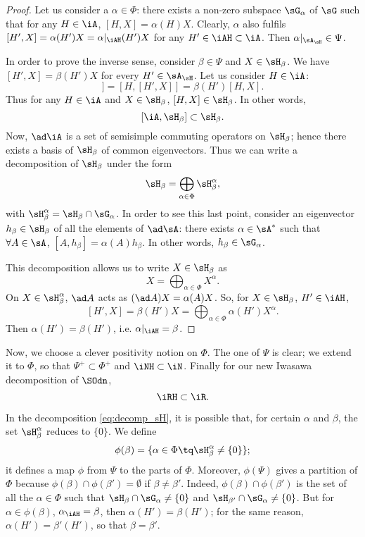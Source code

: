 \begin{proof}
	Let us consider a $\alpha\in\Phi$: there exists a non-zero subspace $\sG_{\alpha}$ of $\sG$ such that for any $H\in\iA$, $[H,X]=\alpha(H)X$. Clearly, $\alpha$ also fulfils $[H',X]=\alpha(H')X=\alpha|_{\iAH}(H')X$ for any $H'\in\iAH\subset\iA$. Then $\alpha|_{\sA_{\sH}}\in\Psi$.

	In order to prove the inverse sense, consider $\beta\in\Psi$ and $X\in\sH_{\beta}$. We have $[H',X]=\beta(H')X$ for every $H'\in\sA_{\sH}$. Let us consider $H\in\iA$:
	\begin{equation}
		[H',[H,X]]=[H,[H',X]]
		=\beta(H')[H,X].
	\end{equation}
	Thus for any $H\in\iA$ and $X\in\sH_{\beta}$, $[H,X]\in\sH_{\beta}$. In other words,
	\[
		[\iA,\sH_{\beta}]\subset\sH_{\beta}.
	\]
	Now, $\ad\iA$ is a set of semisimple commuting operators on $\sH_{\beta}$; hence there exists a basis of $\sH_{\beta}$ of common eigenvectors. Thus we can write a decomposition of $\sH_{\beta}$ under the form
	\begin{equation}\label{eq:decomp_sH}
		\sH_{\beta}=\bigoplus_{\alpha\in\Phi}\sH_{\beta}^{\alpha},
	\end{equation}
	with $\sH_{\beta}^{\alpha}=\sH_{\beta}\cap\sG_{\alpha}$. In order to see this last point, consider an eigenvector $h_{\beta}\in\sH_{\beta}$ of all the elements of $\ad\sA$: there exists $\alpha\in\sA^*$ such that $\forall A\in\sA$, $[A,h_{\beta}]=\alpha(A)h_{\beta}$. In other words, $h_{\beta}\in\sG_{\alpha}$.

	This decomposition allows us to write $X\in\sH_{\beta}$ as
	\[
		X=\bigoplus_{\alpha\in\Phi}X^{\alpha}.
	\]
	On $X\in\sH_{\beta}^{\alpha}$, $\ad A$ acts as $(\ad A)X=\alpha(A)X$.  So, for $X\in\sH_{\beta}$, $H'\in\iAH$,
	\[
		[H',X]=\beta(H')X=\bigoplus_{\alpha\in\Phi}\alpha(H')X^{\alpha}.
	\]
	Then $\alpha(H')=\beta(H')$, i.e. $\alpha|_{\iAH}=\beta$.

\end{proof}

Now, we choose a clever positivity notion on $\Phi$. The one of $\Psi$ is clear; we extend it to $\Phi$, so that $\Psi^+\subset\Phi^+$ and $\iNH\subset\iN$. Finally for our new Iwasawa decomposition of $\SOdn$,
\[
	\iRH\subset\iR.
\]

In the decomposition \eqref{eq:decomp_sH}, it is possible that, for certain $\alpha$ and $\beta$, the set $\sH_{\beta}^{\alpha}$ reduces to $\{0\}$. We define
\begin{equation}
	\phi(\beta)=\{ \alpha\in\Phi\tq \sH_{\beta}^{\alpha}\neq\{0\} \};
\end{equation}
it defines a map $\phi$ from $\Psi$ to the parts of $\Phi$. Moreover, $\phi(\Psi)$ gives a partition of $\Phi$ because $\phi(\beta)\cap\phi(\beta')=\emptyset$ if $\beta\neq\beta'$. Indeed, $\phi(\beta)\cap\phi(\beta')$ is the set of all the $\alpha\in\Phi$ such that $\sH_{\beta}\cap\sG_{\alpha}\neq\{0\}$ and $\sH_{\beta'}\cap\sG_{\alpha}\neq\{0\}$. But for $\alpha\in\phi(\beta)$, $\alpha_{\iAH}=\beta$, then $\alpha(H')=\beta(H')$; for the same reason, $\alpha(H')=\beta'(H')$, so that $\beta=\beta'$.


